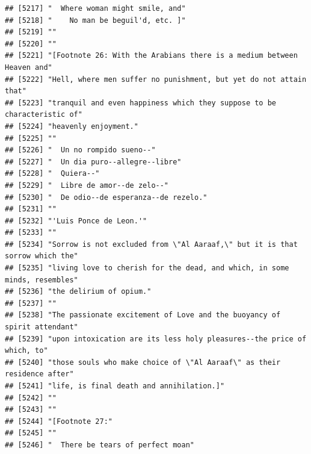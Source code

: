\documentclass{article}\usepackage[]{graphicx}\usepackage[]{color}
\makeatletter
\newenvironment{kframe}{%
 \def\at@end@of@kframe{}%
 \ifinner\ifhmode%
  \def\at@end@of@kframe{\end{minipage}}%
  \begin{minipage}{\columnwidth}%
 \fi\fi%
 \def\FrameCommand##1{\hskip\@totalleftmargin \hskip-\fboxsep
 \colorbox{shadecolor}{##1}\hskip-\fboxsep
     \hskip-\linewidth \hskip-\@totalleftmargin \hskip\columnwidth}%
 \MakeFramed {\advance\hsize-\width
   \@totalleftmargin\z@ \linewidth\hsize
   \@setminipage}}%
 {\par\unskip\endMakeFramed%
 \at@end@of@kframe}
\newenvironment{knitrout}{}{} %
\makeatother
\begin{document}
\begin{knitrout}
\begin{kframe}
\begin{verbatim}
## [5217] "  Where woman might smile, and"                                              
## [5218] "    No man be beguil'd, etc. ]"                                              
## [5219] ""                                                                            
## [5220] ""                                                                            
## [5221] "[Footnote 26: With the Arabians there is a medium between Heaven and"        
## [5222] "Hell, where men suffer no punishment, but yet do not attain that"            
## [5223] "tranquil and even happiness which they suppose to be characteristic of"      
## [5224] "heavenly enjoyment."                                                         
## [5225] ""                                                                            
## [5226] "  Un no rompido sueno--"                                                     
## [5227] "  Un dia puro--allegre--libre"                                               
## [5228] "  Quiera--"                                                                  
## [5229] "  Libre de amor--de zelo--"                                                  
## [5230] "  De odio--de esperanza--de rezelo."                                         
## [5231] ""                                                                            
## [5232] "'Luis Ponce de Leon.'"                                                       
## [5233] ""                                                                            
## [5234] "Sorrow is not excluded from \"Al Aaraaf,\" but it is that sorrow which the"  
## [5235] "living love to cherish for the dead, and which, in some minds, resembles"    
## [5236] "the delirium of opium."                                                      
## [5237] ""                                                                            
## [5238] "The passionate excitement of Love and the buoyancy of spirit attendant"      
## [5239] "upon intoxication are its less holy pleasures--the price of which, to"       
## [5240] "those souls who make choice of \"Al Aaraaf\" as their residence after"       
## [5241] "life, is final death and annihilation.]"                                     
## [5242] ""                                                                            
## [5243] ""                                                                            
## [5244] "[Footnote 27:"                                                               
## [5245] ""                                                                            
## [5246] "  There be tears of perfect moan"                                            

\end{verbatim}
\end{kframe}
\end{knitrout}
\end{document}
